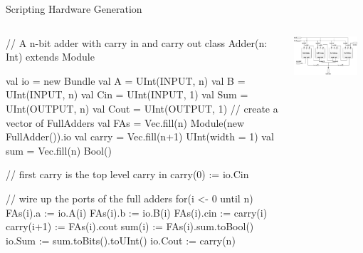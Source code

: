 \documentclass[xcolor=pdflatex,dvipsnames,table]{beamer}
\begin{document}
\begin{frame}[fragile]{Scripting Hardware Generation}

\begin{columns}

{
\begin{scala}
// A n-bit adder with carry in and carry out
class Adder(n: Int) extends Module {
  val io = new Bundle {
    val A    = UInt(INPUT, n)
    val B    = UInt(INPUT, n)
    val Cin  = UInt(INPUT, 1)
    val Sum  = UInt(OUTPUT, n)
    val Cout = UInt(OUTPUT, 1)
  }
  // create a vector of FullAdders
  val FAs   = Vec.fill(n){ Module(new FullAdder()).io }
  val carry = Vec.fill(n+1){ UInt(width = 1) }
  val sum   = Vec.fill(n){ Bool() }

  // first carry is the top level carry in
  carry(0) := io.Cin

  // wire up the ports of the full adders
  for(i <- 0 until n) {
    FAs(i).a   := io.A(i)
    FAs(i).b   := io.B(i)
    FAs(i).cin := carry(i)
    carry(i+1) := FAs(i).cout
    sum(i)     := FAs(i).sum.toBool()
  }
  io.Sum  := sum.toBits().toUInt()
  io.Cout := carry(n)
}
\end{scala}
}


\begin{center}
\includegraphics[width=0.9\textwidth]{../getting-started/figs/4_Bit_Adder.jpg}
\end{center}
\end{columns}

\end{frame}


\end{document}
